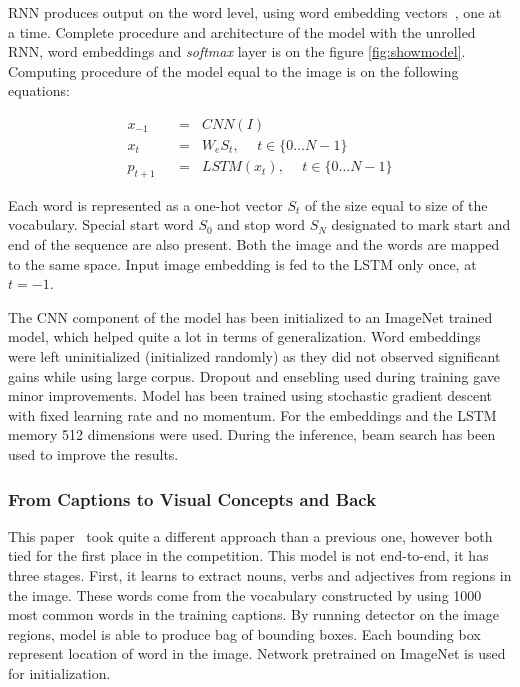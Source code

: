 RNN produces output on the word level, using word embedding vectors~\cite{DBLP:journals/corr/abs-1301-3781}, one at a time. Complete procedure and architecture of the model with the unrolled RNN, word embeddings and \emph{softmax} layer is on the figure \ref{fig:showmodel}. Computing procedure of the model equal to the image is on the following equations:

\belowdisplayskip=24pt
\begin{align}
x_{-1}  \hspace{7pt}&=\hspace{7pt} CNN(I) \label{eq:showmodel1}\\
x_t     \hspace{7pt}&=\hspace{7pt} W_eS_t,\hspace{15pt} t\in\{0\ldots N-1\}  \label{eq:showmodel2}\\
p_{t+1} \hspace{7pt}&=\hspace{7pt} LSTM(x_t),\hspace{15pt} t\in\{0\ldots N-1\}  \label{eq:showmodel3}
\end{align}

Each word is represented as a one-hot vector $ S_t $ of the size equal to size of the vocabulary. Special start word $ S_0 $ and stop word $ S_N $ designated to mark start and end of the sequence are also present. Both the image and the words are mapped to the same space. Input image embedding is fed to the LSTM only once, at $ t=-1 $.

The CNN component of the model has been initialized to an ImageNet trained model, which helped quite a lot in terms of generalization. Word embeddings were left uninitialized (initialized randomly) as they did not observed significant gains while using large corpus. Dropout and ensebling used during training gave minor improvements. Model has been trained using stochastic gradient descent with fixed learning rate and no momentum. For the embeddings and the LSTM memory 512 dimensions were used. During the inference, beam search has been used to improve the results.

\subsubsection{From Captions to Visual Concepts and Back} \label{subsubsec:fromCaptions}

This paper~\cite{DBLP:journals/corr/FangGISDDGHMPZZ14} took quite a different approach than a previous one, however both tied for the first place in the competition. This model is not end-to-end, it has three stages. First, it learns to extract nouns, verbs and adjectives from regions in the image. These words come from the vocabulary constructed by using 1000 most common words in the training captions. By running detector on the image regions, model is able to produce bag of bounding boxes. Each bounding box represent location of word in the image. Network pretrained on ImageNet is used for initialization.

